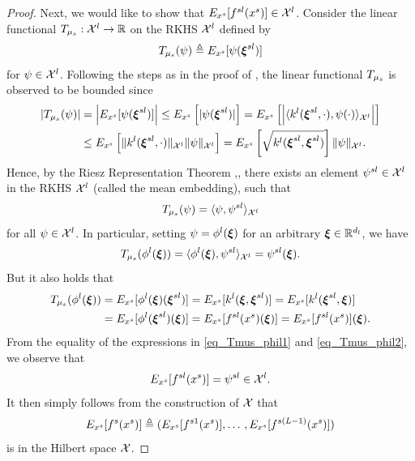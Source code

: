 \documentclass[review,supplement,onefignum,onetabnum]{siamonline250211}
\begin{document}
\begin{proof}
    

Next, we would like to show that $E_{x^s}[f^{sl}(x^s)] \in \mathcal{X}^l$. Consider the linear functional $T_{\mu_s}: \mathcal{X}^l \rightarrow \mathbb{R}$ on the RKHS $\mathcal{X}^l$ defined by
%
\[
T_{\mu_s}(\psi) \triangleq E_{x^s}[ \psi(\boldsymbol{\xi}^{sl}) ]  
\]
%
for $\psi \in \mathcal{X}^l$. Following the steps as in the proof of \cite[Lemma 3]{GrettonBRSS12}, the linear functional $T_{\mu_s}$ is observed to be bounded since 
%
\begin{equation*}
\begin{split}
| T_{\mu_s}(\psi) | &= \left| E_{x^s}[ \psi(\boldsymbol{\xi}^{sl}) ] \right |
\leq  E_{x^s} \left[ | \psi(\boldsymbol{\xi}^{sl}) | \right]  
=  E_{x^s} \left[ \left|  \langle k^l( \boldsymbol{\xi}^{sl}, \cdot) , \psi(\cdot)    \rangle_{\mathcal{X}^l} \right| \right]  \\
& \leq E_{x^s}  \left[    \|   k^l( \boldsymbol{\xi}^{sl}, \cdot)  \|_{\mathcal{X}^l}  \|  \psi \|_{\mathcal{X}^l}   \right]
= E_{x^s} \left[ \sqrt{k^l( \boldsymbol{\xi}^{sl}, \boldsymbol{\xi}^{sl})}   \right]   \|  \psi \|_{\mathcal{X}^l}.
\end{split}
\end{equation*}
%
Hence, by the Riesz Representation Theorem \cite[Theorem 12.5]{BachmanN66},\cite[Lemma 3]{GrettonBRSS12}, there exists an element $\psi^{sl} \in \mathcal{X}^l$ in the RKHS $\mathcal{X}^l$ (called the mean embedding), such that 
%
\[
T_{\mu_s}(\psi) = \langle  \psi, \psi^{sl} \rangle_{\mathcal{X}^l}
\]
%
for all $\psi \in \mathcal{X}^l$. In particular, setting $\psi = \phi^l(\boldsymbol{\xi})$ for an arbitrary $\boldsymbol{\xi} \in \mathbb{R}^{d_l}$, we have
%
\begin{equation}
\label{eq_Tmus_phil1}
T_{\mu_s}(\phi^l(\boldsymbol{\xi})) = \langle  \phi^l(\boldsymbol{\xi}), \psi^{sl} \rangle_{\mathcal{X}^l}
=\psi^{sl} (\boldsymbol{\xi}). 
\end{equation}
%
But it also holds that
%
\begin{equation}
\label{eq_Tmus_phil2}
\begin{split}
T_{\mu_s}(\phi^l(\boldsymbol{\xi}))  &=  E_{x^s}[ \phi^l(\boldsymbol{\xi})(\boldsymbol{\xi}^{sl}) ] = E_{x^s}[ k^l(\boldsymbol{\xi}, \boldsymbol{\xi}^{sl}) ]
= E_{x^s}[ k^l(\boldsymbol{\xi}^{sl}, \boldsymbol{\xi}) ] \\
&= E_{x^s}[ \phi^l(\boldsymbol{\xi}^{sl}) (\boldsymbol{\xi}) ]
=E_{x^s}[ f^{sl}(x^s) (\boldsymbol{\xi}) ] = E_{x^s}[ f^{sl}(x^s)  ] (\boldsymbol{\xi}).
\end{split}
\end{equation}
%
From the equality of the expressions in \eqref{eq_Tmus_phil1} and \eqref{eq_Tmus_phil2}, we observe that
%
\[
    E_{x^s}[ f^{sl}(x^s)  ] = \psi^{sl} \in \mathcal{X}^l.
\] 
%
It then simply follows from the construction of $\mathcal{X}$ that 
\[
    E_{x^s}[f^s(x^s)] \triangleq ( E_{x^s}[f^{s1} (x^s)], \dots \, , E_{x^s}[f^{s(L-1)}(x^s)]    )  \\ 
\]
%
is in the Hilbert space $\mathcal{X}$.

\end{proof}
\end{document}
